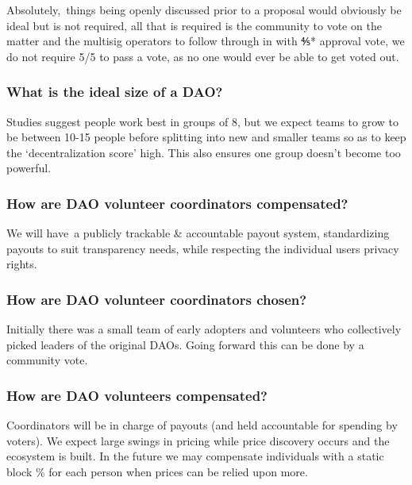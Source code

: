 {Absolutely,}{~things being openly discussed prior to a proposal would
obviously be ideal but is not required, all that is required is the
community to vote on the matter and the multisig operators to follow
through in with ⅘* approval vote, we do not require 5/5 to pass a vote,
as no one would ever be able to get voted out.}

\hypertarget{h.ubpb5asszrfg}{%
\subsubsection{\texorpdfstring{{What is the ideal size of a
DAO?}}{What is the ideal size of a DAO?}}\label{h.ubpb5asszrfg}}

{S}{tudies suggest people work best in groups of 8, but we expect teams
to grow to be between 10-15 people before splitting into new and smaller
teams so as to keep the `}{decentralization score}{' high. This also
ensures one group doesn't become too powerful.}

\hypertarget{h.9xncipshms80}{%
\subsubsection{\texorpdfstring{{How are DAO volunteer coordinators
compensated?}}{How are DAO volunteer coordinators compensated?}}\label{h.9xncipshms80}}

{We will have}{~a publicly trackable \& accountable payout system,
standardizing payouts to suit transparency needs, while respecting the
individual users privacy rights. }

\hypertarget{h.3krrog4lgegd}{%
\subsubsection{\texorpdfstring{{How are DAO volunteer coordinators
chosen?}}{How are DAO volunteer coordinators chosen?}}\label{h.3krrog4lgegd}}

{Initially there was a small team of early adopters and volunteers who
collectively picked leaders of the original DAOs. Going forward this can
be done by a community vote.}

\hypertarget{h.cxkjdiwq9jaz}{%
\subsubsection{\texorpdfstring{{How are DAO volunteers
compensated?}}{How are DAO volunteers compensated?}}\label{h.cxkjdiwq9jaz}}

{Coordinators will be in charge of payouts (and held accountable for
spending by voters). We expect large swings in pricing while price
discovery occurs and the ecosystem is built. In the future we may
compensate individuals with a static block \% for each person when
prices can be relied upon more.}

